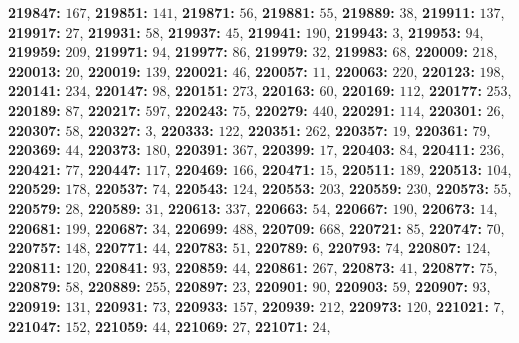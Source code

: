 \textsf{\bfseries 219847:} $167$, \textsf{\bfseries 219851:} $141$, \textsf{\bfseries 219871:} $56$, \textsf{\bfseries 219881:} $55$, \textsf{\bfseries 219889:} $38$, \textsf{\bfseries 219911:} $137$, \textsf{\bfseries 219917:} $27$, \textsf{\bfseries 219931:} $58$, \textsf{\bfseries 219937:} $45$, \textsf{\bfseries 219941:} $190$, \textsf{\bfseries 219943:} $3$, \textsf{\bfseries 219953:} $94$, \textsf{\bfseries 219959:} $209$, \textsf{\bfseries 219971:} $94$, \textsf{\bfseries 219977:} $86$, \textsf{\bfseries 219979:} $32$, \textsf{\bfseries 219983:} $68$, \textsf{\bfseries 220009:} $218$, \textsf{\bfseries 220013:} $20$, \textsf{\bfseries 220019:} $139$, \textsf{\bfseries 220021:} $46$, \textsf{\bfseries 220057:} $11$, \textsf{\bfseries 220063:} $220$, \textsf{\bfseries 220123:} $198$, \textsf{\bfseries 220141:} $234$, \textsf{\bfseries 220147:} $98$, \textsf{\bfseries 220151:} $273$, \textsf{\bfseries 220163:} $60$, \textsf{\bfseries 220169:} $112$, \textsf{\bfseries 220177:} $253$, \textsf{\bfseries 220189:} $87$, \textsf{\bfseries 220217:} $597$, \textsf{\bfseries 220243:} $75$, \textsf{\bfseries 220279:} $440$, \textsf{\bfseries 220291:} $114$, \textsf{\bfseries 220301:} $26$, \textsf{\bfseries 220307:} $58$, \textsf{\bfseries 220327:} $3$, \textsf{\bfseries 220333:} $122$, \textsf{\bfseries 220351:} $262$, \textsf{\bfseries 220357:} $19$, \textsf{\bfseries 220361:} $79$, \textsf{\bfseries 220369:} $44$, \textsf{\bfseries 220373:} $180$, \textsf{\bfseries 220391:} $367$, \textsf{\bfseries 220399:} $17$, \textsf{\bfseries 220403:} $84$, \textsf{\bfseries 220411:} $236$, \textsf{\bfseries 220421:} $77$, \textsf{\bfseries 220447:} $117$, \textsf{\bfseries 220469:} $166$, \textsf{\bfseries 220471:} $15$, \textsf{\bfseries 220511:} $189$, \textsf{\bfseries 220513:} $104$, \textsf{\bfseries 220529:} $178$, \textsf{\bfseries 220537:} $74$, \textsf{\bfseries 220543:} $124$, \textsf{\bfseries 220553:} $203$, \textsf{\bfseries 220559:} $230$, \textsf{\bfseries 220573:} $55$, \textsf{\bfseries 220579:} $28$, \textsf{\bfseries 220589:} $31$, \textsf{\bfseries 220613:} $337$, \textsf{\bfseries 220663:} $54$, \textsf{\bfseries 220667:} $190$, \textsf{\bfseries 220673:} $14$, \textsf{\bfseries 220681:} $199$, \textsf{\bfseries 220687:} $34$, \textsf{\bfseries 220699:} $488$, \textsf{\bfseries 220709:} $668$, \textsf{\bfseries 220721:} $85$, \textsf{\bfseries 220747:} $70$, \textsf{\bfseries 220757:} $148$, \textsf{\bfseries 220771:} $44$, \textsf{\bfseries 220783:} $51$, \textsf{\bfseries 220789:} $6$, \textsf{\bfseries 220793:} $74$, \textsf{\bfseries 220807:} $124$, \textsf{\bfseries 220811:} $120$, \textsf{\bfseries 220841:} $93$, \textsf{\bfseries 220859:} $44$, \textsf{\bfseries 220861:} $267$, \textsf{\bfseries 220873:} $41$, \textsf{\bfseries 220877:} $75$, \textsf{\bfseries 220879:} $58$, \textsf{\bfseries 220889:} $255$, \textsf{\bfseries 220897:} $23$, \textsf{\bfseries 220901:} $90$, \textsf{\bfseries 220903:} $59$, \textsf{\bfseries 220907:} $93$, \textsf{\bfseries 220919:} $131$, \textsf{\bfseries 220931:} $73$, \textsf{\bfseries 220933:} $157$, \textsf{\bfseries 220939:} $212$, \textsf{\bfseries 220973:} $120$, \textsf{\bfseries 221021:} $7$, \textsf{\bfseries 221047:} $152$, \textsf{\bfseries 221059:} $44$, \textsf{\bfseries 221069:} $27$, \textsf{\bfseries 221071:} $24$, 
